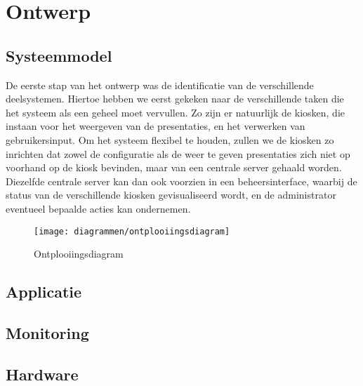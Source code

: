 \part{Ontwerp}
\label{part:ontwerp}

%
%

\chapter{Systeemmodel}
\label{chap:systeemmodel}

De eerste stap van het ontwerp was de identificatie van de verschillende deelsystemen. Hiertoe hebben we eerst gekeken naar de verschillende taken die het systeem als een geheel moet vervullen. Zo zijn er natuurlijk de kiosken, die instaan voor het weergeven van de presentaties, en het verwerken van gebruikersinput. Om het systeem flexibel te houden, zullen we de kiosken zo inrichten dat zowel de configuratie als de weer te geven presentaties zich niet op voorhand op de kiosk bevinden, maar van een centrale server gehaald worden. Diezelfde centrale server kan dan ook voorzien in een beheersinterface, waarbij de status van de verschillende kiosken gevisualiseerd wordt, en de administrator eventueel bepaalde acties kan ondernemen.

\begin{figure}
	\texttt{[image: diagrammen/ontplooiingsdiagram]}
	\caption{Ontplooiingsdiagram}
\end{figure}

%
%

\chapter{Applicatie}
\label{chap:applicatie}


%
%

\chapter{Monitoring}
\label{chap:monitoring}


%
%

\chapter{Hardware}
\label{chap:hardware}
